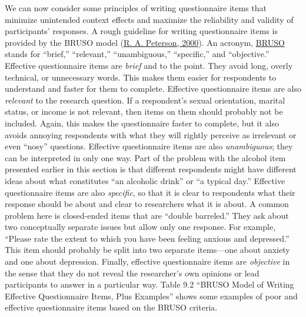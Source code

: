 \documentclass[
]{krantz}
\begin{document}
We can now consider some principles of writing questionnaire items that minimize unintended context effects and maximize the reliability and validity of participants' responses. A rough guideline for writing questionnaire items is provided by the BRUSO model (\protect\hyperlink{ref-peterson2000constructing}{R. A. Peterson, 2000}). An acronym, \protect\hyperlink{bruso}{BRUSO} stands for ``brief,'' ``relevant,'' ``unambiguous,'' ``specific,'' and ``objective.'' Effective questionnaire items are \emph{brief} and to the point. They avoid long, overly technical, or unnecessary words. This makes them easier for respondents to understand and faster for them to complete. Effective questionnaire items are also \emph{relevant} to the research question. If a respondent's sexual orientation, marital status, or income is not relevant, then items on them should probably not be included. Again, this makes the questionnaire faster to complete, but it also avoids annoying respondents with what they will rightly perceive as irrelevant or even ``nosy'' questions. Effective questionnaire items are also \emph{unambiguous}; they can be interpreted in only one way. Part of the problem with the alcohol item presented earlier in this section is that different respondents might have different ideas about what constitutes ``an alcoholic drink'' or ``a typical day.'' Effective questionnaire items are also \emph{specific}, so that it is clear to respondents what their response should be about and clear to researchers what it is about. A common problem here is closed-ended items that are ``double barreled.'' They ask about two conceptually separate issues but allow only one response. For example, ``Please rate the extent to which you have been feeling anxious and depressed.'' This item should probably be split into two separate items---one about anxiety and one about depression. Finally, effective questionnaire items are \emph{objective} in the sense that they do not reveal the researcher's own opinions or lead participants to answer in a particular way. Table 9.2 ``BRUSO Model of Writing Effective Questionnaire Items, Plus Examples'' shows some examples of poor and effective questionnaire items based on the BRUSO criteria.
\end{document}

